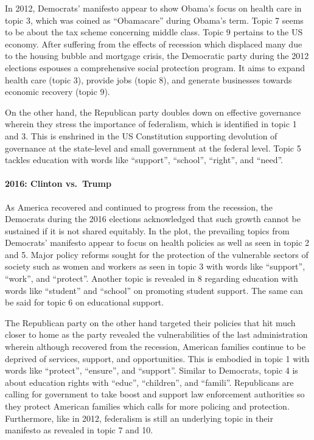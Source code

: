 \documentclass[
]{article}
\begin{document}
In 2012, Democrats' manifesto appear to show Obama's focus on health
care in topic 3, which was coined as ``Obamacare'' during Obama's term.
Topic 7 seems to be about the tax scheme concerning middle class. Topic
9 pertains to the US economy. After suffering from the effects of
recession which displaced many due to the housing bubble and mortgage
crisis, the Democratic party during the 2012 elections espouses a
comprehensive social protection program. It aims to expand health care
(topic 3), provide jobs (topic 8), and generate businesses towards
economic recovery (topic 9).

On the other hand, the Republican party doubles down on effective
governance wherein they stress the importance of federalism, which is
identified in topic 1 and 3. This is enshrined in the US Constitution
supporting devolution of governance at the state-level and small
government at the federal level. Topic 5 tackles education with words
like ``support'', ``school'', ``right'', and ``need''.

\hypertarget{clinton-vs.-trump}{%
\paragraph{2016: Clinton vs.~Trump}\label{clinton-vs.-trump}}

As America recovered and continued to progress from the recession, the
Democrats during the 2016 elections acknowledged that such growth cannot
be sustained if it is not shared equitably. In the plot, the prevailing
topics from Democrats' manifesto appear to focus on health policies as
well as seen in topic 2 and 5. Major policy reforms sought for the
protection of the vulnerable sectors of society such as women and
workers as seen in topic 3 with words like ``support'', ``work'', and
``protect''. Another topic is revealed in 8 regarding education with
words like ``student'' and ``school'' on promoting student support. The
same can be said for topic 6 on educational support.

The Republican party on the other hand targeted their policies that hit
much closer to home as the party revealed the vulnerabilities of the
last administration wherein although recovered from the recession,
American families continue to be deprived of services, support, and
opportunities. This is embodied in topic 1 with words like ``protect'',
``ensure'', and ``support''. Similar to Democrats, topic 4 is about
education rights with ``educ'', ``children'', and ``famili''.
Republicans are calling for government to take boost and support law
enforcement authorities so they protect American families which calls
for more policing and protection. Furthermore, like in 2012, federalism
is still an underlying topic in their manifesto as revealed in topic 7
and 10.
\end{document}
